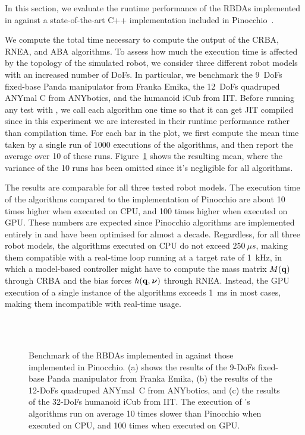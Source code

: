 In this section, we evaluate the runtime performance of the \aclp{RBDA} implemented in \jaxsim against a state-of-the-art C++ implementation included in Pinocchio~\parencite{carpentier_pinocchio_2015, carpentier_pinocchio_2019}.

We compute the total time necessary to compute the output of the \ac{CRBA}, \ac{RNEA}, and \ac{ABA} algorithms.
To assess how much the execution time is affected by the topology of the simulated robot, we consider three different robot models with an increased number of \acp{DoF}.
In particular, we benchmark the 9~\acp{DoF} fixed-base Panda manipulator from Franka Emika, the 12~\acp{DoF} quadruped ANYmal C from ANYbotics, and the humanoid iCub from IIT.
Before running any test with \jaxsim, we call each algorithm one time so that it can get \ac{JIT} compiled since in this experiment we are interested in their runtime performance rather than compilation time.
For each bar in the plot, we first compute the mean time taken by a single run of 1000 executions of the algorithms, and then report the average over 10 of these runs.
Figure~\ref{fig:jaxsim_benchmark_algos} shows the resulting mean, where the variance of the 10 runs has been omitted since it's negligible for all algorithms.

The results are comparable for all three tested robot models.
The execution time of the \jaxsim algorithms compared to the implementation of Pinocchio are about 10 times higher when executed on \ac{CPU}, and 100 times higher when executed on \ac{GPU}.
These numbers are expected since Pinocchio algorithms are implemented entirely in \cpp and have been optimised for almost a decade.
Regardless, for all three robot models, the \jaxsim algorithms executed on \ac{CPU} do not exceed $250~\mu s$, making them compatible with a real-time loop running at a target rate of 1~kHz, in which a model-based controller might have to compute the mass matrix $M(\mathbf{q})$ through \ac{CRBA} and the bias forces $h(\mathbf{q}, \prescript{}{}{\boldsymbol{\nu}})$ through \ac{RNEA}.
Instead, the \ac{GPU} execution of a single instance of the algorithms exceeds 1~ms in most cases, making them incompatible with real-time usage.

\begin{figure}
    \centering
    \\
    \\
    \caption{Benchmark of the \acp{RBDA} implemented in \jaxsim against those implemented in Pinocchio. (a) shows the results of the 9-\acp{DoF} fixed-base Panda manipulator from Franka Emika, (b) the results of the 12-\acp{DoF} quadruped ANYmal~C from ANYbotics, and (c) the results of the 32-\acp{DoF} humanoid iCub from IIT. The execution of \jaxsim's algorithms run on average 10 times slower than Pinocchio when executed on \acs{CPU}, and 100 times when executed on \acs{GPU}.}
    \label{fig:jaxsim_benchmark_algos}
\end{figure}


